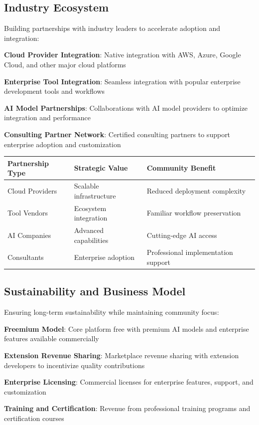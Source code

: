 \subsection*{Industry Ecosystem}

Building partnerships with industry leaders to accelerate adoption and integration:

\begin{expandedlist}
    \item \textbf{Cloud Provider Integration}: Native integration with AWS, Azure, Google Cloud, and other major cloud platforms
    \item \textbf{Enterprise Tool Integration}: Seamless integration with popular enterprise development tools and workflows
    \item \textbf{AI Model Partnerships}: Collaborations with AI model providers to optimize integration and performance
    \item \textbf{Consulting Partner Network}: Certified consulting partners to support enterprise adoption and customization
\end{expandedlist}

\begin{center}
\begin{tabular}{@{}lll@{}}
\toprule
\textbf{Partnership Type} & \textbf{Strategic Value} & \textbf{Community Benefit} \\
\midrule
Cloud Providers & Scalable infrastructure & Reduced deployment complexity \\
Tool Vendors & Ecosystem integration & Familiar workflow preservation \\
AI Companies & Advanced capabilities & Cutting-edge AI access \\
Consultants & Enterprise adoption & Professional implementation support \\
\bottomrule
\end{tabular}
\end{center}

\subsection*{Sustainability and Business Model}

Ensuring long-term sustainability while maintaining community focus:

\begin{expandedlist}
    \item \textbf{Freemium Model}: Core platform free with premium AI models and enterprise features available commercially
    \item \textbf{Extension Revenue Sharing}: Marketplace revenue sharing with extension developers to incentivize quality contributions
    \item \textbf{Enterprise Licensing}: Commercial licenses for enterprise features, support, and customization
    \item \textbf{Training and Certification}: Revenue from professional training programs and certification courses
\end{expandedlist}


